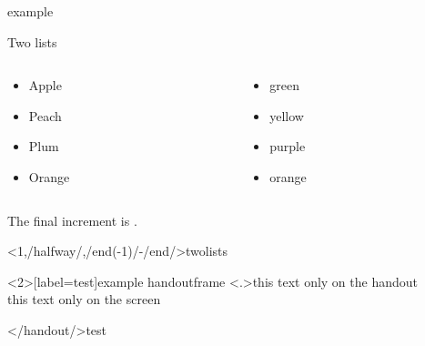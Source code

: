 \documentclass[\jobname]{beamer} %
\begin{document}
\begin{frame}[label=twolists]{example \theexampc}
  \resetincr
  \begin{center}
    Two lists \\
  \end{center}
  \begin{columns}
    \begin{column}{.2\textwidth}
      \begin{itemize}[<+-| alert@+>]
      \item Apple \item Peach  \item Plum \item Orange
      \end{itemize}
    \end{column}
    \begin{column}{.2\textwidth}
      \resetincr[/startlist/]%
      \begin{itemize}[<+-| alert@+>]
      \item green \item yellow \item purple \item orange
      \end{itemize}
    \end{column}
  \end{columns}
  \vfill
  \onslide<+->
  The final increment is . 
\end{frame}

\againframe<1,/halfway/,/end(-1)/-/end/>{twolists}

\begin{examp}
  \resetincr[2]
\end{examp}

\begin{frame}<2>[label=test]{example handoutframe}
  \handoutscanonly
  \resetincr
  \only<.>{this text only on the handout\\}
  \onslide<+->
  this text only on the screen\\
\end{frame}

\handoutframe</handout/>{test}
\end{document}
